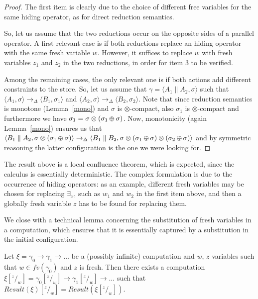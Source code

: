 \documentclass{llncs}
\def\odiv{\, {\ominus\hspace{-7.7pt} \div} \,}
\begin{document}
\begin{proof}
	The first item is clearly due to the choice of different free variables 
	for the same hiding operator, as for direct reduction semantics.
	
	So, let us assume that the two reductions occur on the opposite sides of a parallel operator.
	A first relevant case is if both reductions replace an hiding operator with the same fresh variable
	$w$. However, it suffices to replace $w$ 
	with fresh variables $z_1$ and $z_2$ in  the two reductions, in order for item 3 to be verified.
		
	Among the remaining cases, the only relevant one is if both actions add 
	different constraints to the store.
	So, let us assume that $\gamma = \langle A_1 \parallel A_2, \sigma \rangle$ such that 
	$\langle A_1, \sigma \rangle \rightarrow_\Delta \langle B_1, \sigma_1 \rangle$
	and
	$\langle A_2, \sigma \rangle \rightarrow_\Delta \langle B_2, \sigma_2 \rangle$.
	Note that since reduction semantics is monotone (Lemma~\ref{mono})
	and $\sigma$ is $\otimes$-compact, also $\sigma_1$
	is $\otimes$-compact and furthermore we have
	$\sigma_1 = \sigma \otimes (\sigma_1 \odiv \sigma)$.
	Now,  monotonicity (again Lemma~\ref{mono}) ensures us that
	$\langle B_1 \parallel A_2, \sigma \otimes (\sigma_1 \odiv \sigma) \rangle
	\rightarrow_\Delta
	\langle B_1 \parallel B_2, \sigma \otimes (\sigma_1 \odiv \sigma) \otimes (\sigma_2 \odiv \sigma) \rangle$ 
	and by symmetric reasoning the latter configuration 
	is the one we were looking for.
\end{proof}


The result above is a local confluence theorem, which is expected, since the calculus is essentially deterministic.
The complex formulation is  due to the occurrence of hiding operators: as an example, different fresh variables may be chosen
for replacing $\exists_x$, such as  $w_1$ and $w_2$ in the first item above, and then a globally fresh variable $z$ has to 
be found for replacing them.

We close with a technical lemma concerning the substitution of fresh variables in a computation, which ensures that it is essentially captured by a substitution in the initial configuration.

\begin{lemma}\label{lem:SubComp}
Let $\xi = \gamma_0  \rightarrow \gamma_1  \rightarrow \dots$ be a (possibly infinite)
computation and $w$, $z$ variables such that $w \in fv(\gamma_0)$ and $z$ is fresh.
Then there exists a computation 
$\xi [^z/_w] = \gamma_0 [^z/_w]   \rightarrow \gamma_1 [^z/_w]  \rightarrow \dots$ 
such that $\mathit{Result}(\xi) [^z/_w] = \mathit{Result}(\xi [^z/_w])$.
\end{lemma}
\end{document}
